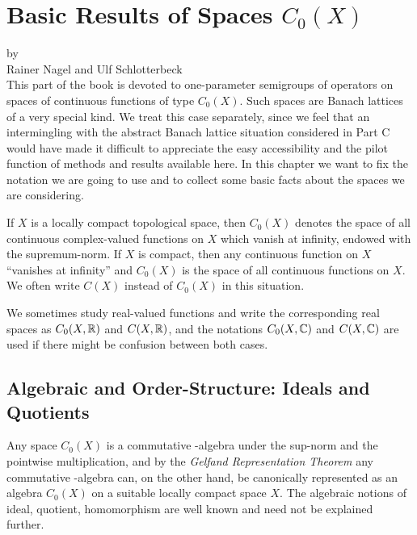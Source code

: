 \chapter{Basic Results of Spaces \texorpdfstring{$C_{0}(X)$}{C(X)}}
\label{chap:b1}
{\Large
\vspace*{-.75cm}
by \\[.25em]
Rainer Nagel and Ulf Schlotterbeck
\vspace{.75cm}
\\
}
This part of the book is devoted to one-parameter semigroups of operators on spaces of continuous functions of type $C_{0}(X)$.
Such spaces are Banach lattices of a very special kind.
We treat this case separately, since we feel that an intermingling with the abstract Banach lattice situation considered in Part C would have made it difficult to appreciate the easy accessibility and the pilot function of methods and results available here.
In this chapter we want to fix the notation we are going to use and to collect some basic facts about the spaces we are considering.

If $X$ is a locally compact topological space, then $C_{0}(X)$ denotes the space of all continuous complex-valued functions on $X$ which vanish at infinity, endowed with the supremum-norm.
If $X$ is compact, then any continuous function on $X$ \enquote{vanishes at infinity} and $C_{0}(X)$ is the space of all continuous functions on $X$.
We often write $C(X)$ instead of $C_{0}(X)$ in this situation.

We sometimes study real-valued functions and write the corresponding real spaces as $C_{0}(X,\mathbb{R})$ and 
$C(X,\mathbb{R})$, and the notations $C_{0}(X,\mathbb{C})$ and $C(X,\mathbb{C})$ are used if there might be confusion between both cases.
\section{Algebraic and Order-Structure: Ideals and Quotients}\label{sec:b1-1}
Any space $C_{0}(X)$ is a commutative \CA-algebra under the sup-norm and the pointwise multiplication, and by the \emph{Gelfand Representation Theorem} any commutative \CA-algebra can, on the other hand, be canonically represented as an algebra $C_{0}(X)$ on a suitable locally compact space $X$.
The algebraic notions of ideal, quotient, homomorphism are well known and need not be explained further.

